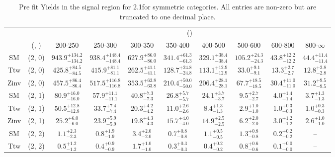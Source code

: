 \begin{table}[h!]
\tiny
\centering
\caption{Pre fit Yields in the signal region for 2.1\ifb for symmetric categories. All entries are non-zero but are truncated to one decimal place.\label{tab:prednodata_sig_comb_sym}}
\begin{tabular}
{cccccccccc}
	\hline\hline
	&	& \multicolumn{8}{c}{\scalht (\gev)}\\ 
	&	 (\njet, \nb) & 200-250 & 250-300 & 300-350 & 350-400 & 400-500 & 500-600 & 600-800 & 800-$\infty$ \\ [0.8ex] 
\hline
	SM & (2, 0) & $943.9^{+ 134.2 }_{- 134.2 }$ & $938.4^{+ 148.4 }_{- 148.4 }$ & $627.9^{+ 86.0 }_{- 86.0 }$ & $341.4^{+ 61.3 }_{- 61.3 }$ & $329.1^{+ 38.4 }_{- 38.4 }$ & $105.2^{+ 24.3 }_{- 24.3 }$ & $43.8^{+ 12.2 }_{- 12.2 }$ & $44.4^{+ 11.4 }_{- 11.4 }$ \\[0.5ex] 
	Ttw & (2, 0) & $425.8^{+ 84.5 }_{- 84.5 }$ & $415.9^{+ 81.1 }_{- 81.1 }$ & $262.5^{+ 41.1 }_{- 41.1 }$ & $128.7^{+ 24.8 }_{- 24.8 }$ & $113.1^{+ 12.9 }_{- 12.9 }$ & $33.0^{+ 9.1 }_{- 9.1 }$ & $13.3^{+ 2.7 }_{- 2.7 }$ & $12.8^{+ 2.8 }_{- 2.8 }$ \\[0.5ex] 
	Zinv & (2, 0) & $457.5^{+ 86.4 }_{- 86.4 }$ & $517.5^{+ 116.8 }_{- 116.8 }$ & $353.5^{+ 63.8 }_{- 63.8 }$ & $210.4^{+ 50.0 }_{- 50.0 }$ & $206.4^{+ 28.1 }_{- 28.1 }$ & $67.7^{+ 18.5 }_{- 18.5 }$ & $30.4^{+ 11.0 }_{- 11.0 }$ & $31.2^{+ 9.5 }_{- 9.5 }$ \\[0.5ex] 
	SM & (2, 1) & $80.9^{+ 16.0 }_{- 16.0 }$ & $57.9^{+ 11.1 }_{- 11.1 }$ & $40.8^{+ 7.3 }_{- 7.3 }$ & $26.8^{+ 5.7 }_{- 5.7 }$ & $24.1^{+ 3.7 }_{- 3.7 }$ & $9.5^{+ 2.7 }_{- 2.7 }$ & $4.0^{+ 1.4 }_{- 1.4 }$ & $3.7^{+ 1.3 }_{- 1.3 }$ \\[0.5ex] 
	Ttw & (2, 1) & $50.5^{+ 12.8 }_{- 12.8 }$ & $33.7^{+ 7.4 }_{- 7.4 }$ & $20.3^{+ 4.2 }_{- 4.2 }$ & $11.0^{+ 2.6 }_{- 2.6 }$ & $8.4^{+ 1.3 }_{- 1.3 }$ & $2.9^{+ 1.0 }_{- 1.0 }$ & $1.0^{+ 0.3 }_{- 0.3 }$ & $1.0^{+ 0.3 }_{- 0.3 }$ \\[0.5ex] 
	Zinv & (2, 1) & $25.2^{+ 6.0 }_{- 6.0 }$ & $23.9^{+ 5.9 }_{- 5.9 }$ & $19.8^{+ 4.3 }_{- 4.3 }$ & $15.7^{+ 4.0 }_{- 4.0 }$ & $14.9^{+ 2.5 }_{- 2.5 }$ & $6.2^{+ 2.0 }_{- 2.0 }$ & $3.0^{+ 1.2 }_{- 1.2 }$ & $2.6^{+ 1.0 }_{- 1.0 }$ \\[0.5ex] 
	SM & (2, 2) & $1.1^{+ 2.3 }_{- 2.3 }$ & $0.8^{+ 1.9 }_{- 1.9 }$ & $3.4^{+ 2.0 }_{- 2.0 }$ & $0.7^{+ 0.8 }_{- 0.8 }$ & $1.1^{+ 0.5 }_{- 0.5 }$ & $1.3^{+ 0.8 }_{- 0.8 }$ & $0.2^{+ 0.2 }_{- 0.2 }$ & -- \\[0.5ex] 
	Ttw & (2, 2) & $0.5^{+ 1.2 }_{- 1.2 }$ & $0.4^{+ 0.9 }_{- 0.9 }$ & $1.7^{+ 1.0 }_{- 1.0 }$ & $0.3^{+ 0.3 }_{- 0.3 }$ & $0.4^{+ 0.2 }_{- 0.2 }$ & $0.8^{+ 0.6 }_{- 0.6 }$ & $0.1^{+ 0.0 }_{- 0.0 }$ & -- \\[0.5ex] 

\end{tabular}
\end{table}

